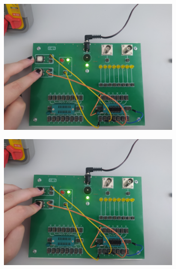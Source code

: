 \begin{itemize}
\begin{figure}[H]
\begin{subfigure}[h]{0.4\textwidth}
                    \includegraphics[width=\textwidth]{img/NOR/test/1652306732798_scaled.png}
                \end{subfigure}
                \begin{subfigure}[h]{0.4\textwidth}
                    \includegraphics[width=\textwidth]{img/NOR/test/1652306732785_scaled.png}
                \end{subfigure}
        \end{figure}

\pagebreak


\end{itemize}
